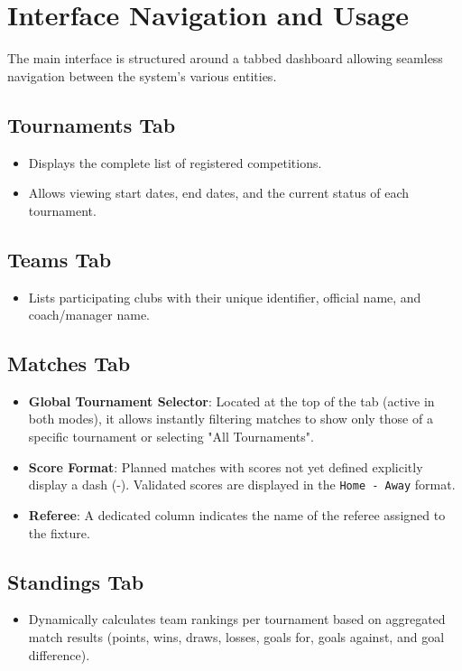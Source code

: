 \documentclass[11pt,a4paper]{article}
\begin{document}
\section{Interface Navigation and Usage}

The main interface is structured around a tabbed dashboard allowing seamless navigation between the system's various entities.

\subsection*{Tournaments Tab}
\begin{itemize}
    \item Displays the complete list of registered competitions.
    \item Allows viewing start dates, end dates, and the current status of each tournament.
\end{itemize}

\subsection*{Teams Tab}
\begin{itemize}
    \item Lists participating clubs with their unique identifier, official name, and coach/manager name.
\end{itemize}

\subsection*{Matches Tab}
\begin{itemize}
    \item \textbf{Global Tournament Selector}: Located at the top of the tab (active in both modes), it allows instantly filtering matches to show only those of a specific tournament or selecting "All Tournaments".
    \item \textbf{Score Format}: Planned matches with scores not yet defined explicitly display a dash (-). Validated scores are displayed in the \texttt{Home - Away} format.
    \item \textbf{Referee}: A dedicated column indicates the name of the referee assigned to the fixture.
\end{itemize}

\subsection*{Standings Tab}
\begin{itemize}
    \item Dynamically calculates team rankings per tournament based on aggregated match results (points, wins, draws, losses, goals for, goals against, and goal difference).
\end{itemize}
\end{document}
